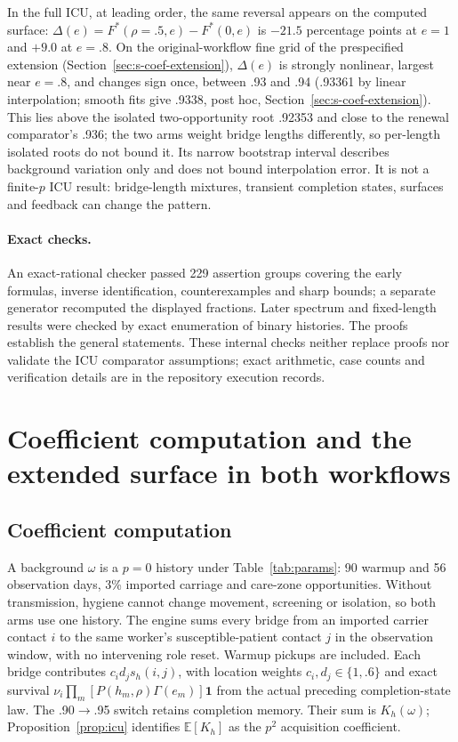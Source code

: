 \documentclass[11pt]{article}
\newcommand{\E}{\mathbb E}
\newcommand{\mn}{\ensuremath{-}}
\begin{document}
In the full ICU, at leading order, the same reversal appears on the computed surface:
$\Delta(e)=F^*(\rho{=}.5,e)-F^*(0,e)$ is $\mn21.5$ percentage points at $e=1$ and
$+9.0$ at $e=.8$. On the original-workflow fine grid of the prespecified
extension (Section~\ref{sec:s-coef-extension}), $\Delta(e)$ is strongly
nonlinear, largest near $e=.8$, and changes sign once, between .93 and .94
(.93361 by linear interpolation; smooth fits give .9338, post hoc,
Section~\ref{sec:s-coef-extension}). This lies above the isolated two-opportunity
root .92353 and close to the renewal comparator's .936; the two arms weight
bridge lengths differently, so per-length isolated roots do not bound it. Its narrow bootstrap interval describes background
variation only and does not bound interpolation error. It is not a finite-$p$ ICU result:
bridge-length mixtures, transient completion states, surfaces and feedback can
change the pattern.

\paragraph{Exact checks.} An exact-rational checker passed 229 assertion groups
covering the early formulas, inverse identification, counterexamples and sharp
bounds; a separate generator recomputed the displayed fractions. Later spectrum
and fixed-length results were checked by exact enumeration of binary histories.
The proofs establish the general statements. These internal checks neither
replace proofs nor validate the ICU comparator assumptions; exact arithmetic,
case counts and verification details are in the repository execution records.

\section{Coefficient computation and the extended surface in both workflows}\label{sec:s-coefficient}

\subsection{Coefficient computation}\label{sec:s-coef-method}
A background $\omega$ is a $p=0$ history under Table~\ref{tab:params}: 90
warmup and 56 observation days, 3\% imported carriage and care-zone opportunities.
Without transmission, hygiene cannot change movement, screening or isolation,
so both arms use one history. The engine sums every bridge from an imported
carrier contact $i$ to the same worker's susceptible-patient contact $j$ in the
observation window, with no intervening role reset. Warmup pickups are included.
Each bridge contributes $c_id_js_h(i,j)$, with location weights
$c_i,d_j\in\{1,.6\}$ and exact survival
$\nu_i\prod_m[P(h_m,\rho)\Gamma(e_m)]\boldsymbol 1$ from the actual preceding
completion-state law. The .90$\to$.95 switch retains completion memory.
Their sum is $K_h(\omega)$; Proposition~\ref{prop:icu} identifies $\E[K_h]$
as the $p^2$ acquisition coefficient.
\end{document}
